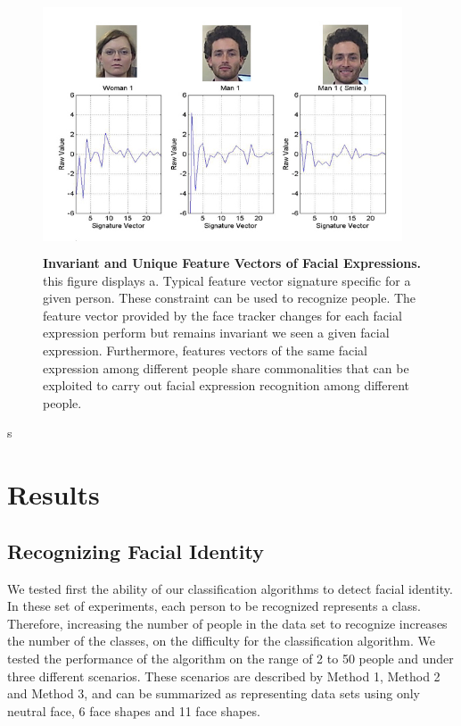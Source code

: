 \documentclass[]{article}
\begin{document}
\begin{figure}[ht]
\begin{center}
\vspace{-3mm}
\includegraphics[width=0.95\textwidth,height=75mm]{figures/comparationBetweenFaces2.jpg}
\end{center}
\caption{\textbf{Invariant and Unique Feature Vectors of Facial Expressions.} this figure displays a. Typical feature 
vector signature specific for a given person. These constraint can be used to recognize people. The feature vector
provided by the face tracker changes for each facial expression perform but remains invariant we seen a given facial 
expression. Furthermore, features vectors of the same facial expression among different people share commonalities that
can be exploited to carry out facial expression recognition among different people.}
\label{comparationBetweenFaces}
\end{figure}s

\section{Results}

\subsection{Recognizing Facial Identity}
We tested first the ability of our classification algorithms to detect facial identity. In these set of experiments,
each person to be recognized represents a class. Therefore, increasing the number of people in the data set to recognize
increases the number of the classes, on the difficulty for the classification algorithm. We tested the performance of
the algorithm on the range of 2 to 50 people and under three different scenarios. These scenarios are described by
Method 1, Method 2 and Method 3, and can be summarized as representing data sets using only neutral face, 6 face shapes
and 11 face shapes.
\end{document}
